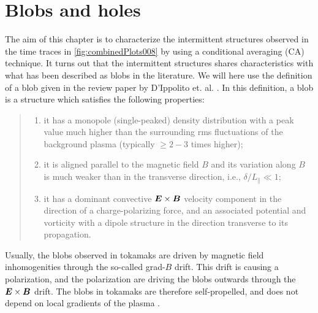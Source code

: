 \section{Blobs and holes}
\label{sec:blobsAndHoles}
%
The aim of this chapter is to characterize the intermittent structures observed in the time traces in \cref{fig:combinedPlots008} by using a conditional averaging (CA) technique.
It turns out that the intermittent structures shares characteristics with what has been described as blobs in the literature.
We will here use the definition of a blob given in the review paper by D'Ippolito et. al. \cite{DIppolito2011}.
In this definition, a blob is a structure which satisfies the following properties:
%
\begin{quote}
    \begin{enumerate}[noitemsep]
            \item  it has a monopole (single-peaked) density distribution with a peak value much higher than the surrounding rms fluctuations of the background plasma (typically $\geq 2-3$ times higher);
            \item  it is aligned parallel to the magnetic field $B$ and its variation along $B$ is much weaker than in the transverse direction, i.e., $\delta/L_\|\ll1$;
            \item it has a dominant convective $\boldsymbol{E}\times\boldsymbol{B}$ velocity component in the direction of a charge-polarizing force, and an associated potential and vorticity with a dipole structure in the direction transverse to its propagation.
    \end{enumerate}
\end{quote}
%
Usually, the blobs observed in tokamaks are driven by magnetic field inhomogenities through the so-called grad-$B$ drift.
This drift is causing a polarization, and the polarization are driving the blobs outwards through the $\boldsymbol{E}\times\boldsymbol{B}$ drift.
The blobs in tokamaks are therefore self-propelled, and does not depend on local gradients of the plasma \cite{Krasheninnikov2008}.

